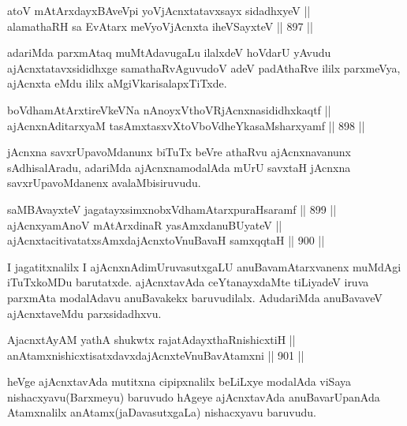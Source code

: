 \begin{shl}
atoV mAtArxdayxBAveV\s pi yoV\s jAcnxtatavxsayx sidadhxyeV || \\
alamathaRH sa EvAtarx meVyoV\s jAcnxta iheVSayxteV \hfill || 897 ||  
\end{shl}

\begin{artha}
adariMda parxmAtaq muMtAdavugaLu ilalxdeV hoVdarU yAvudu ajAcnxtatavxsididhxge samathaRvAguvudoV adeV padAthaRve ililx parxmeVya, ajAcnxta eMdu ililx aMgiVkarisalapxTiTxde.
\end{artha}


\begin{shl}
boVdhamAtArxtireVkeVNa nAnoyxV\s thoVR\s jAcnxnasididhxkaqtf || \\
ajAcnxnAditarxyaM tasAmxtasxvXtoVboVdheYkasaMsharxyamf \hfill || 898 ||  
\end{shl}

\begin{artha}
jAcnxna savxrUpavoMdanunx biTuTx beVre athaRvu ajAcnxnavanunx sAdhisalAradu, adariMda ajAcnxnamodalAda mUrU savxtaH jAcnxna savxrUpavoMdanenx avalaMbisiruvudu.
\end{artha}

\begin{shl}
saMBAvayxteV jagatayxsimxnobxVdhamAtarxpuraHsaramf \hfill || 899 || \\
ajAcnxyamAnoV mAtArxdinaR yasAmxdanuBUyateV || \\
ajAcnxtacitivatatxsAmxdajAcnxtoV\s nuBavaH samxqqtaH \hfill || 900 || 
\end{shl}

\begin{artha}
I jagatitxnalilx I ajAcnxnAdimUruvasutxgaLU anuBavamAtarxvanenx muMdAgi iTuTxkoMDu barutatxde. ajAcnxtavAda ceYtanayxdaMte tiLiyadeV iruva parxmAta modalAdavu anuBavakekx baruvudilalx. AdudariMda anuBavaveV ajAcnxtaveMdu parxsidadhxvu.
\end{artha}


\begin{shl}
AjacnxtAyAM yathA shukwtx rajatAdayxthaRnishicxtiH || \\
anAtamxnishicxtisatxdavxdajAcnxteV\s nuBavAtamxni \hfill || 901 ||  
\end{shl}

\begin{artha}
heVge ajAcnxtavAda mutitxna cipipxnalilx beLiLxye modalAda viSaya nishacxyavu(Barxmeyu) baruvudo hAgeye ajAcnxtavAda anuBavarUpanAda Atamxnalilx anAtamx(jaDavasutxgaLa) nishacxyavu baruvudu.
\end{artha}

